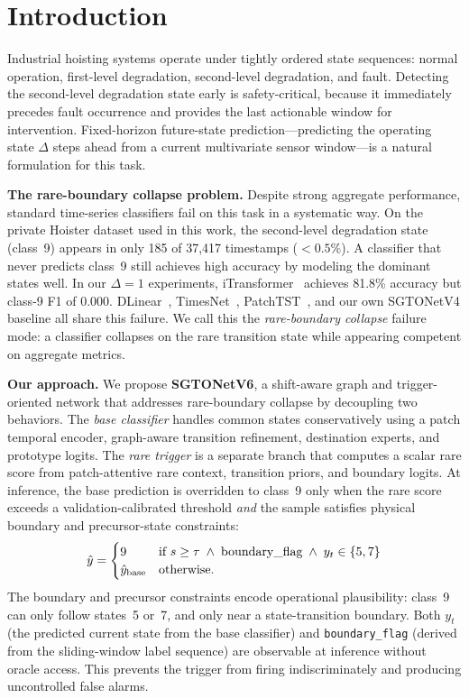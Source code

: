 \section{Introduction}
\label{sec:intro}

Industrial hoisting systems operate under tightly ordered state sequences: normal operation, first-level degradation, second-level degradation, and fault.
Detecting the second-level degradation state early is safety-critical, because it immediately precedes fault occurrence and provides the last actionable window for intervention.
Fixed-horizon future-state prediction---predicting the operating state $\Delta$ steps ahead from a current multivariate sensor window---is a natural formulation for this task.

\textbf{The rare-boundary collapse problem.}
Despite strong aggregate performance, standard time-series classifiers fail on this task in a systematic way.
On the private Hoister dataset used in this work, the second-level degradation state (class~9) appears in only 185 of 37,417 timestamps ($<0.5\%$).
A classifier that never predicts class~9 still achieves high accuracy by modeling the dominant states well.
In our $\Delta{=}1$ experiments, iTransformer~\cite{liu2024itransformer} achieves 81.8\% accuracy but class-9 F1 of 0.000.
DLinear~\cite{zeng2023dlinear}, TimesNet~\cite{wu2023timesnet}, PatchTST~\cite{nie2023patchtst}, and our own SGTONetV4 baseline all share this failure.
We call this the \emph{rare-boundary collapse} failure mode: a classifier collapses on the rare transition state while appearing competent on aggregate metrics.

\textbf{Our approach.}
We propose \textbf{SGTONetV6}, a shift-aware graph and trigger-oriented network that addresses rare-boundary collapse by decoupling two behaviors.
The \emph{base classifier} handles common states conservatively using a patch temporal encoder, graph-aware transition refinement, destination experts, and prototype logits.
The \emph{rare trigger} is a separate branch that computes a scalar rare score from patch-attentive rare context, transition priors, and boundary logits.
At inference, the base prediction is overridden to class~9 only when the rare score exceeds a validation-calibrated threshold \emph{and} the sample satisfies physical boundary and precursor-state constraints:
\begin{equation}
  \hat{y} =
  \begin{cases}
    9 & \text{if } s \geq \tau \;\wedge\; \text{boundary\_flag} \;\wedge\; y_t \in \{5, 7\} \\
    \hat{y}_{\mathrm{base}} & \text{otherwise.}
  \end{cases}
  \label{eq:override}
\end{equation}
The boundary and precursor constraints encode operational plausibility: class~9 can only follow states~5 or~7, and only near a state-transition boundary.
Both $y_t$ (the predicted current state from the base classifier) and \texttt{boundary\_flag} (derived from the sliding-window label sequence) are observable at inference without oracle access.
This prevents the trigger from firing indiscriminately and producing uncontrolled false alarms.

